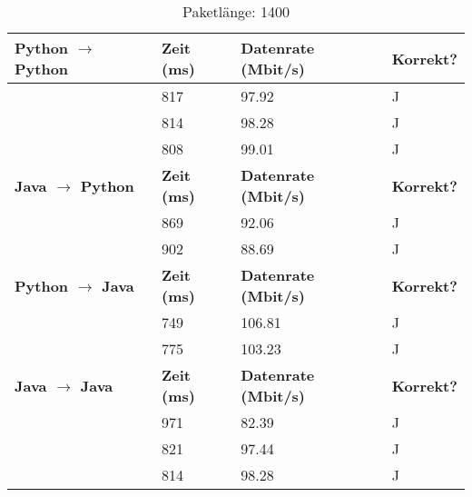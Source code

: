 \documentclass{article}
\begin{document}
    \begin{table}[]
        \caption{Paketlänge: 1400}
        \label{tab:my-tablev2_1400}
        \begin{tabular}{|l|l|l|l|}
            \hline
            \textbf{Python $\rightarrow$ Python} & \textbf{Zeit (ms)} & \textbf{Datenrate (Mbit/s)} & \textbf{Korrekt?} \\ \hline
            & 817      & 97.92          & J        \\ \cline{2-4}
            & 814      & 98.28          & J        \\ \cline{2-4}
            & 808      & 99.01          & J        \\ \hline
            \textbf{Java $\rightarrow$ Python}   & \textbf{Zeit (ms)} & \textbf{Datenrate (Mbit/s)} & \textbf{Korrekt?} \\ \hline
            & 869      & 92.06          & J        \\ \cline{2-4}
            & 902      & 88.69          & J        \\ \hline
            \textbf{Python $\rightarrow$ Java}  & \textbf{Zeit (ms)} & \textbf{Datenrate (Mbit/s)} & \textbf{Korrekt?} \\ \hline
            & 749      & 106.81         & J        \\ \cline{2-4}
            & 775      & 103.23         & J        \\ \hline
            \textbf{Java $\rightarrow$ Java}   & \textbf{Zeit (ms)} & \textbf{Datenrate (Mbit/s)} & \textbf{Korrekt?} \\ \hline
            & 971      & 82.39          & J        \\ \cline{2-4}
            & 821      & 97.44          & J        \\ \cline{2-4}
            & 814      & 98.28          & J        \\ \hline
        \end{tabular}
    \end{table}
\end{document}
